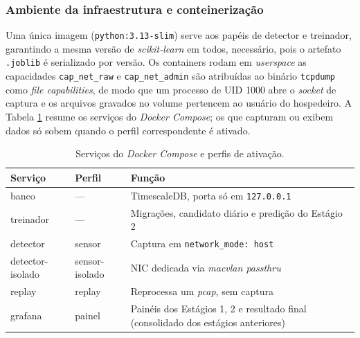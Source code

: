 \documentclass[a4paper,10pt, twocolumn]{article}
\begin{document}
\subsubsection{Ambiente da infraestrutura e conteinerização}

Uma única imagem (\texttt{python:3.13-slim}) serve aos papéis de detector e treinador, garantindo a mesma versão de \textit{scikit-learn} em todos, necessário, pois o artefato \texttt{.joblib} é serializado por versão.
Os containers rodam em \textit{userspace} as capacidades \texttt{cap\_net\_raw} e \texttt{cap\_net\_admin} são
atribuídas ao binário \texttt{tcpdump} como \textit{file capabilities}, de modo que um
processo de UID 1000 abre o \textit{socket} de captura e os arquivos gravados no
volume pertencem ao usuário do hospedeiro. A Tabela \ref{tab:servicos} resume os
serviços do \textit{Docker Compose}; os que capturam ou exibem dados só sobem quando
o perfil correspondente é ativado.

\begin{table}[H]
\centering
\footnotesize
\setlength{\tabcolsep}{3pt}
\begin{tabularx}{\columnwidth}{l l X}
\toprule
\textbf{Serviço} & \textbf{Perfil} & \textbf{Função} \\
\midrule
banco            & ---              & TimescaleDB, porta só em \texttt{127.0.0.1} \\
treinador        & ---              & Migrações, candidato diário e predição do Estágio 2 \\
detector         & sensor           & Captura em \texttt{network\_mode: host} \\
detector-isolado & sensor-isolado   & NIC dedicada via \textit{macvlan passthru} \\
replay           & replay           & Reprocessa um \textit{pcap}, sem captura \\
grafana          & painel           & Painéis dos Estágios 1, 2 e resultado final (consolidado dos estágios anteriores) \\
\bottomrule
\end{tabularx}
\caption{Serviços do \textit{Docker Compose} e perfis de ativação.}
\label{tab:servicos}
\end{table}
\end{document}

